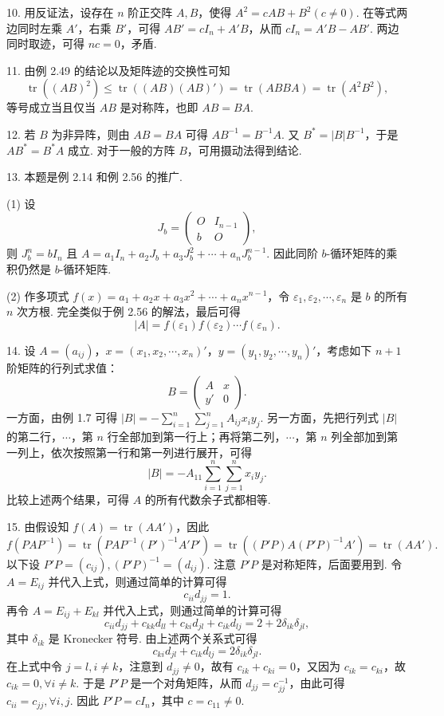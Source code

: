 \documentclass[UTF8, 12pt, fontset=fandol, oneside]{ctexart}
\begin{document}
10. 用反证法，设存在 $n$ 阶正交阵 $A,B$，使得 $A^2=cAB+B^2(c\ne0)$. 在等式两边同时左乘 $A'$，右乘 $B'$，可得 $AB'=cI_n+A'B$，从而 $cI_n=A'B-AB'$. 两边同时取迹，可得 $nc=0$，矛盾.

11. 由例 2.49 的结论以及矩阵迹的交换性可知
\[
\operatorname{tr}((AB)^2)\le \operatorname{tr}((AB)(AB)')
=\operatorname{tr}(ABBA)=\operatorname{tr}(A^2B^2),
\]
等号成立当且仅当 $AB$ 是对称阵，也即 $AB=BA$.

12. 若 $B$ 为非异阵，则由 $AB=BA$ 可得 $AB^{-1}=B^{-1}A$. 又 $B^*=|B|B^{-1}$，于是 $AB^*=B^*A$ 成立. 对于一般的方阵 $B$，可用摄动法得到结论.

13. 本题是例 2.14 和例 2.56 的推广.

(1) 设
\[
J_b=
\left(
\begin{array}{cc}
O & I_{n-1}\\
b & O
\end{array}
\right),
\]
则 $J_b^n=bI_n$ 且 $A=a_1I_n+a_2J_b+a_3J_b^2+\cdots+a_nJ_b^{n-1}$. 因此同阶 $b$-循环矩阵的乘积仍然是 $b$-循环矩阵.

(2) 作多项式 $f(x)=a_1+a_2x+a_3x^2+\cdots+a_nx^{n-1}$，令 $\varepsilon_1,\varepsilon_2,\cdots,\varepsilon_n$ 是 $b$ 的所有 $n$ 次方根. 完全类似于例 2.56 的解法，最后可得
\[
|A|=f(\varepsilon_1)f(\varepsilon_2)\cdots f(\varepsilon_n).
\]

14. 设 $A=(a_{ij})$，$x=(x_1,x_2,\cdots,x_n)'$，$y=(y_1,y_2,\cdots,y_n)'$，考虑如下 $n+1$ 阶矩阵的行列式求值：
\[
B=
\left(
\begin{array}{cc}
A & x\\
y' & 0
\end{array}
\right).
\]
一方面，由例 1.7 可得 $|B|=-\sum\limits_{i=1}^n\sum\limits_{j=1}^n A_{ij}x_iy_j$. 另一方面，先把行列式 $|B|$ 的第二行，$\cdots$，第 $n$ 行全部加到第一行上；再将第二列，$\cdots$，第 $n$ 列全部加到第一列上，依次按照第一行和第一列进行展开，可得
\[
|B|=-A_{11}\sum_{i=1}^n\sum_{j=1}^n x_iy_j.
\]
比较上述两个结果，可得 $A$ 的所有代数余子式都相等.

15. 由假设知 $f(A)=\operatorname{tr}(AA')$，因此
\[
f(PAP^{-1})=\operatorname{tr}(PAP^{-1}(P')^{-1}A'P')
=\operatorname{tr}((P'P)A(P'P)^{-1}A')
=\operatorname{tr}(AA').
\]
以下设 $P'P=(c_{ij}),(P'P)^{-1}=(d_{ij})$. 注意 $P'P$ 是对称矩阵，后面要用到. 令 $A=E_{ij}$ 并代入上式，则通过简单的计算可得
\[
c_{ii}d_{jj}=1.
\]
再令 $A=E_{ij}+E_{kl}$ 并代入上式，则通过简单的计算可得
\[
c_{ii}d_{jj}+c_{kk}d_{ll}+c_{ki}d_{jl}+c_{ik}d_{lj}=2+2\delta_{ik}\delta_{jl},
\]
其中 $\delta_{ik}$ 是 Kronecker 符号. 由上述两个关系式可得
\[
c_{ki}d_{jl}+c_{ik}d_{lj}=2\delta_{ik}\delta_{jl}.
\]
在上式中令 $j=l,i\ne k$，注意到 $d_{jj}\ne0$，故有 $c_{ik}+c_{ki}=0$，又因为 $c_{ik}=c_{ki}$，故 $c_{ik}=0,\forall i\ne k$. 于是 $P'P$ 是一个对角矩阵，从而 $d_{jj}=c_{jj}^{-1}$，由此可得 $c_{ii}=c_{jj},\forall i,j$. 因此 $P'P=cI_n$，其中 $c=c_{11}\ne0$.
\end{document}
